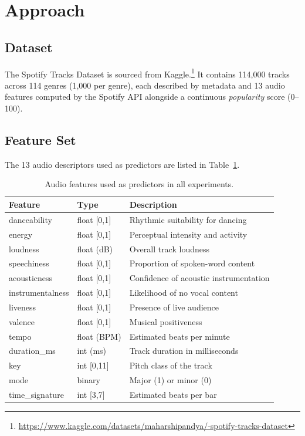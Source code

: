 \section{Approach}

\subsection{Dataset}

The Spotify Tracks Dataset is sourced from Kaggle.\footnote{\url{https://www.kaggle.com/datasets/maharshipandya/-spotify-tracks-dataset}}
It contains 114{,}000 tracks across 114 genres (1{,}000 per genre), each described by metadata and 13 audio features computed by the Spotify API alongside a continuous \textit{popularity} score (0--100).

\subsection{Feature Set}

The 13 audio descriptors used as predictors are listed in Table~\ref{tab:features}.

\begin{table}[h]
\centering\small\setlength{\tabcolsep}{4pt}
\begin{tabular}{@{}llp{5.2cm}@{}}
\hline
\textbf{Feature} & \textbf{Type} & \textbf{Description} \\
\hline
danceability     & float [0,1]  & Rhythmic suitability for dancing \\
energy           & float [0,1]  & Perceptual intensity and activity \\
loudness         & float (dB)   & Overall track loudness \\
speechiness      & float [0,1]  & Proportion of spoken-word content \\
acousticness     & float [0,1]  & Confidence of acoustic instrumentation \\
instrumentalness & float [0,1]  & Likelihood of no vocal content \\
liveness         & float [0,1]  & Presence of live audience \\
valence          & float [0,1]  & Musical positiveness \\
tempo            & float (BPM)  & Estimated beats per minute \\
duration\_ms     & int (ms)     & Track duration in milliseconds \\
key              & int [0,11]   & Pitch class of the track \\
mode             & binary       & Major (1) or minor (0) \\
time\_signature  & int [3,7]    & Estimated beats per bar \\
\hline
\end{tabular}
\caption{Audio features used as predictors in all experiments.}
\label{tab:features}
\end{table}

